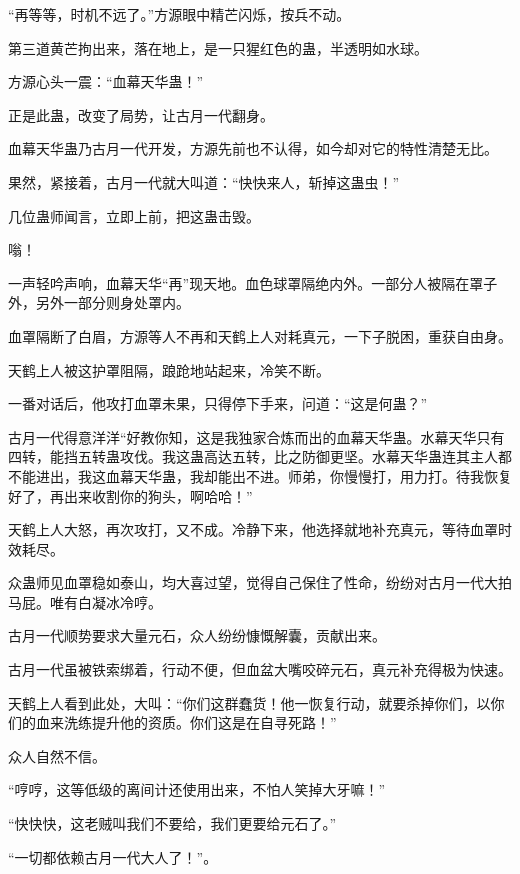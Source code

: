 \begin{this_body}
“再等等，时机不远了。”方源眼中精芒闪烁，按兵不动。

第三道黄芒拘出来，落在地上，是一只猩红色的蛊，半透明如水球。

方源心头一震：“血幕天华蛊！”

正是此蛊，改变了局势，让古月一代翻身。

血幕天华蛊乃古月一代开发，方源先前也不认得，如今却对它的特性清楚无比。

果然，紧接着，古月一代就大叫道：“快快来人，斩掉这蛊虫！”

几位蛊师闻言，立即上前，把这蛊击毁。

嗡！

一声轻吟声响，血幕天华“再”现天地。血色球罩隔绝内外。一部分人被隔在罩子外，另外一部分则身处罩内。

血罩隔断了白眉，方源等人不再和天鹤上人对耗真元，一下子脱困，重获自由身。

天鹤上人被这护罩阻隔，踉跄地站起来，冷笑不断。

一番对话后，他攻打血罩未果，只得停下手来，问道：“这是何蛊？”

古月一代得意洋洋“好教你知，这是我独家合炼而出的血幕天华蛊。水幕天华只有四转，能挡五转蛊攻伐。我这蛊高达五转，比之防御更坚。水幕天华蛊连其主人都不能进出，我这血幕天华蛊，我却能出不进。师弟，你慢慢打，用力打。待我恢复好了，再出来收割你的狗头，啊哈哈！”

天鹤上人大怒，再次攻打，又不成。冷静下来，他选择就地补充真元，等待血罩时效耗尽。

众蛊师见血罩稳如泰山，均大喜过望，觉得自己保住了性命，纷纷对古月一代大拍马屁。唯有白凝冰冷哼。

古月一代顺势要求大量元石，众人纷纷慷慨解囊，贡献出来。

古月一代虽被铁索绑着，行动不便，但血盆大嘴咬碎元石，真元补充得极为快速。

天鹤上人看到此处，大叫：“你们这群蠢货！他一恢复行动，就要杀掉你们，以你们的血来洗练提升他的资质。你们这是在自寻死路！”

众人自然不信。

“哼哼，这等低级的离间计还使用出来，不怕人笑掉大牙嘛！”

“快快快，这老贼叫我们不要给，我们更要给元石了。”

“一切都依赖古月一代大人了！”。

\end{this_body}

